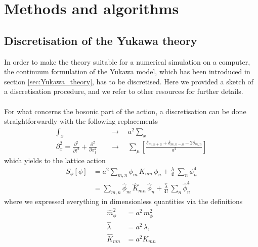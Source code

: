 
\chapter{Methods and algorithms}
\label{chapt:methods}

\section{Discretisation of the Yukawa theory}
\label{sec:lattice_discretisation}
In order to make the theory suitable for a numerical simulation on a computer, the continuum formulation of the Yukawa model, which has been introduced in section \ref{sec:Yukawa_theory}, has to be discretised. Here we provided a sketch of a discretisation procedure, and we refer to other resources \cite{rothe_LGT,gattringer_LQCD,creutz_2023,Montvay1994QuantumLattice} for further details. \\~\\
For what concerns the bosonic part of the action, a discretisation can be done straightforwardly with the following replacements
\begin{equation*}
    \begin{aligned}
        \int_x \quad &\to \quad a^2 \sum_x \\
        \partial^2_x = \frac{\partial^2}{\partial t^2} + \frac{\partial^2}{\partial x_1^2} \quad &\to \quad \sum_\mu \left[\frac{\delta_{m,n+\mu} + \delta_{m,n-\mu} - 2 \delta_{m,n}}{a^2}\right]
    \end{aligned}
\end{equation*}
which yields to the lattice action
\begin{equation*}
        \begin{aligned} 
        		S_\phi [\phi] 	&=  a^2 \sum_{m,n} \phi_m \, K_{mn} \, \phi_n + \frac{\lambda}{4!} \, \sum_n \phi_n^4 \\
        					&=  \sum_{m,n} \hat{\phi}_m \, \widehat{K}_{mn} \, \hat{\phi}_n + \frac{\hat{\lambda}}{4!} \, \sum_n \hat{\phi}_n^4
	\end{aligned}
\end{equation*}
where we expressed everything in dimensionless quantities via the definitions
\begin{equation}
    \begin{aligned}
        \hat m_\phi^2 &= a^2 \, m_\phi^2 \\
        \hat \lambda &= a^{2} \, \lambda, \\
        \widehat{K}_{mn} &= a^2 K_{mn}
    \end{aligned}
    \label{eq:couplings_redefitinion}
\end{equation}
